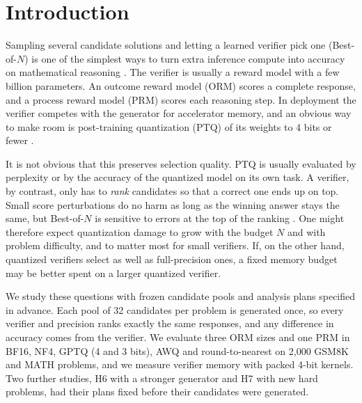 \section{Introduction}\label{sec:intro}

Sampling several candidate solutions and letting a learned verifier pick one
(Best-of-$N$) is one of the simplest ways to turn extra inference compute into accuracy
on mathematical reasoning \cite{cobbe2021gsm8k,lightman2023verify,snell2024scaling}. The
verifier is usually a reward model with a few billion parameters. An outcome reward
model (ORM) scores a complete response, and a process reward model (PRM) scores each
reasoning step. In deployment the verifier competes with the generator for accelerator
memory, and an obvious way to make room is post-training quantization (PTQ) of its
weights to 4 bits or fewer \cite{frantar2023gptq,lin2024awq,dettmers2023qlora}.

It is not obvious that this preserves selection quality. PTQ is usually evaluated by
perplexity or by the accuracy of the quantized model on its own task. A verifier, by
contrast, only has to \emph{rank} candidates so that a correct one ends up on top. Small
score perturbations do no harm as long as the winning answer stays the same, but
Best-of-$N$ is sensitive to errors at the top of the ranking
\cite{gao2023overoptimization}. One might therefore expect quantization damage to grow
with the budget $N$ and with problem difficulty, and to matter most for small verifiers.
If, on the other hand, quantized verifiers select as well as full-precision ones, a
fixed memory budget may be better spent on a larger quantized verifier.

We study these questions with frozen candidate pools and analysis plans specified in
advance. Each pool of 32 candidates per problem is generated once, so every verifier and
precision ranks exactly the same responses, and any difference in accuracy comes from
the verifier. We evaluate three ORM sizes and one PRM in BF16, NF4, GPTQ (4 and 3 bits),
AWQ and round-to-nearest on 2,000 GSM8K and MATH problems, and we measure verifier memory
with packed 4-bit kernels. Two further studies, H6 with a stronger generator and H7 with new hard problems, had
their plans fixed before their candidates were generated.

